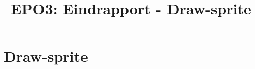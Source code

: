 \documentclass{scrartcl} %
\author{}
\title{EPO3: Eindrapport - Draw-sprite}
\begin{document}
\section{Draw-sprite}
\label{sec:draw-sprite}
\end{document}
